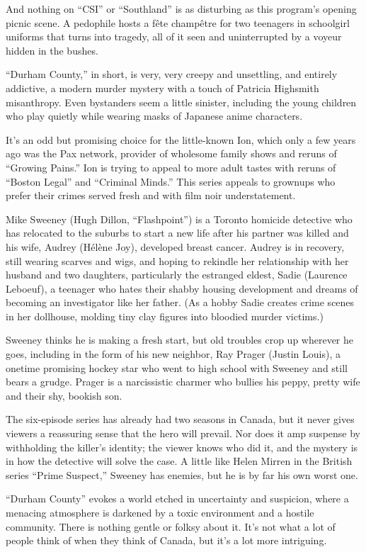 ﻿\documentclass[12pt]{article}
\begin{document}
And nothing on ``CSI'' or ``Southland'' is as disturbing as this program's opening picnic scene. A
pedophile hosts a fête champêtre for two teenagers in schoolgirl uniforms that turns into tragedy,
all of it seen and uninterrupted by a voyeur hidden in the bushes.

``Durham County,'' in short, is very, very creepy and unsettling, and entirely addictive, a modern
murder mystery with a touch of Patricia Highsmith misanthropy. Even bystanders seem a little
sinister, including the young children who play quietly while wearing masks of Japanese anime
characters.

It's an odd but promising choice for the little-known Ion, which only a few years ago was the Pax
network, provider of wholesome family shows and reruns of ``Growing Pains.'' Ion is trying to appeal
to more adult tastes with reruns of ``Boston Legal'' and ``Criminal Minds.'' This series appeals to
grownups who prefer their crimes served fresh and with film noir understatement.

Mike Sweeney (Hugh Dillon, ``Flashpoint'') is a Toronto homicide detective who has relocated to the
suburbs to start a new life after his partner was killed and his wife, Audrey (H\'el\`ene Joy),
developed breast cancer. Audrey is in recovery, still wearing scarves and wigs, and hoping to
rekindle her relationship with her husband and two daughters, particularly the estranged eldest,
Sadie (Laurence Leboeuf), a teenager who hates their shabby housing development and dreams of
becoming an investigator like her father. (As a hobby Sadie creates crime scenes in her dollhouse,
molding tiny clay figures into bloodied murder victims.)

Sweeney thinks he is making a fresh start, but old troubles crop up wherever he goes, including in
the form of his new neighbor, Ray Prager (Justin Louis), a onetime promising hockey star who went to
high school with Sweeney and still bears a grudge. Prager is a narcissistic charmer who bullies his
peppy, pretty wife and their shy, bookish son.

The six-episode series has already had two seasons in Canada, but it never gives viewers a
reassuring sense that the hero will prevail. Nor does it amp suspense by withholding the killer's
identity; the viewer knows who did it, and the mystery is in how the detective will solve the case.
A little like Helen Mirren in the British series ``Prime Suspect,'' Sweeney has enemies, but he is
by far his own worst one.

``Durham County'' evokes a world etched in uncertainty and suspicion, where a menacing atmosphere is
darkened by a toxic environment and a hostile community. There is nothing gentle or folksy about it.
It's not what a lot of people think of when they think of Canada, but it's a lot more intriguing.
\end{document}
